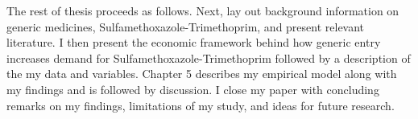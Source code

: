 \indent The rest of thesis proceeds as follows. Next, lay out background information on generic medicines, Sulfamethoxazole-Trimethoprim, and present relevant literature. I then present the economic framework behind how generic entry increases demand for Sulfamethoxazole-Trimethoprim followed by a description of the my data and variables. Chapter 5 describes my empirical model along with my findings and is followed by discussion. I close my paper with concluding remarks on my findings, limitations of my study, and ideas for future research.
